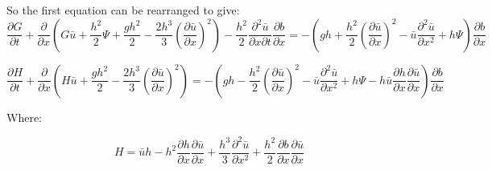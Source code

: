 \documentclass{article}
\begin{document}
So the first equation can be rearranged to give:
\[\frac{\partial G}{\partial t} + \frac{\partial}{\partial x} \left( G\bar{u} + \frac{h^2}{2}\Psi + \frac{gh^2}{2} - \frac{2h^3}{3} \left(\frac{\partial \bar{u}}{\partial x}\right)^2   \right) - \frac{h^2}{2}\frac{\partial^2 \bar{u}}{\partial x \partial t} \frac{\partial b}{\partial x}  =  - \left(gh + \frac{h^2}{2}\left(\frac{\partial \bar{u}}{\partial x}\right)^2 - \bar{u}\frac{\partial^2 \bar{u}}{\partial x^2} + h \Psi \right)  \frac{\partial b}{\partial x}\]


\[\frac{\partial H}{\partial t} + \frac{\partial}{\partial x} \left( H\bar{u} + \frac{gh^2}{2} - \frac{2h^3}{3} \left(\frac{\partial \bar{u}}{\partial x}\right)^2   \right) =  - \left(gh - \frac{h^2}{2}\left(\frac{\partial \bar{u}}{\partial x}\right)^2 - \bar{u}\frac{\partial^2 \bar{u}}{\partial x^2} + h \Psi - h \bar{u}\frac{\partial h}{\partial x}\frac{\partial \bar{u}}{\partial x} \right)  \frac{\partial b}{\partial x}\]

Where:

\[H = \bar{u} h - h^2 \frac{\partial h}{\partial x} \frac{\partial \bar{u}}{\partial x} + \frac{h^3}{3}\frac{\partial^2 \bar{u}}{\partial x^2} + \frac{h^2}{2} \frac{\partial b}{\partial x}\frac{\partial \bar{u}}{\partial x}  \]
\end{document}
